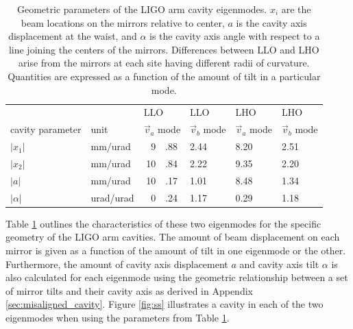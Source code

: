 \begin{table}
\centering
\caption[Geometric parameters of the LIGO arm cavity
  eigenmodes]{Geometric parameters of the LIGO arm cavity
  eigenmodes. $x_i$ are the beam locations on the mirrors relative
  to center, $a$ is the cavity axis displacement at the waist, and
  $\alpha$ is the cavity axis angle with respect to a line joining the
  centers of the mirrors. Differences between LLO and LHO arise from the
  mirrors at each site having different radii of curvature. Quantities
  are expressed as a function of the amount of tilt in a particular mode.}
\begin{tabular}{l l r@{}l l l l}
\hline
& & \multicolumn{2}{l}{LLO} & LLO & LHO & LHO \\
cavity parameter & unit & \multicolumn{2}{l}{$\vec{v}_a$ mode} & $\vec{v}_b$ mode & $\vec{v}_a$ mode & $\vec{v}_b$ mode \\
\hline
$|x_1|$ & mm/urad & 9&.88 & 2.44 & 8.20 & 2.51\\
$|x_2|$ & mm/urad & 10&.84 & 2.22 & 9.35 & 2.20\\
$|a|$ & mm/urad & 10&.17 & 1.01 & 8.48 & 1.34 \\
$|\alpha|$ & urad/urad & 0&.24 & 1.17 & 0.29 & 1.18 \\
\hline
\end{tabular}
\label{table:cav_geometric}
\end{table}


Table \ref{table:cav_geometric} outlines the characteristics of these
two eigenmodes for the specific geometry of the LIGO arm cavities. The
amount of beam displacement on each mirror is given as a function of
the amount of tilt in one eigenmode or the other. Furthermore, the
amount of cavity axis displacement $a$ and cavity axis tilt $\alpha$
is also calculated for each eigenmode using the geometric relationship
between a set of mirror tilts and their cavity axis as derived in
Appendix \ref{sec:misaligned_cavity}. Figure \ref{fig:ss} illustrates
a cavity in each of the two eigenmodes when using the parameters from
Table \ref{table:cav_geometric}.


